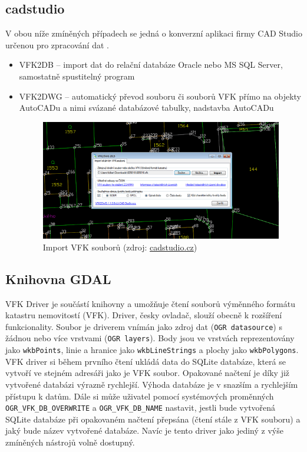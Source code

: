 \subsection{cadstudio}
V obou níže zmíněných případech se jedná o konverzní aplikaci firmy CAD Studio
určenou pro zpracování dat .
\begin{itemize}[leftmargin=50pt]
\item VFK2DB -- import dat do relační databáze Oracle nebo MS SQL Server, samostatně spustitelný program \cite{vfk2db} %
\item VFK2DWG -- automatický převod souboru či souborů VFK přímo na objekty AutoCADu a nimi svázané databázové tabulky, nadstavba AutoCADu \cite{vfk2dwg}

\begin{figure}[H]
	 \centering
      \includegraphics[width=14cm]{./pictures/vfk2dwg.png}
      \caption{Import VFK souborů (zdroj:
\href{http://www.cadstudio.cz/img/vfk2dwg11.gif}{cadstudio.cz})}
      \label{fig:cadstudio}
  \end{figure}
\end{itemize}
\subsection{Knihovna GDAL}
\label{subsec:gdal_vfk}
VFK Driver je součástí knihovny  a umožňuje čtení souborů
výměnného formátu katastru nemovitostí (VFK). Driver, česky ovladač,
slouží obecně k rozšíření funkcionality. Soubor  je driverem
vnímán jako zdroj dat (\verb|OGR datasource|) s žádnou nebo více
vrstvami (\verb|OGR layers|). Body jsou ve vrstvách reprezentovány
jako \verb|wkbPoints|, linie a hranice jako \verb|wkbLineStrings| a
plochy jako \verb|wkbPolygons|. VFK driver si během prvního čtení
ukládá data do SQLite databáze, která se vytvoří ve stejném adresáři
jako je VFK soubor. Opakované načtení je díky již vytvořené databázi
výrazně rychlejší. Výhoda databáze je v snazším a rychlejším přístupu
k datům. Dále si může uživatel pomocí systémových proměnných
\verb|OGR_VFK_DB_OVERWRITE| a \verb|OGR_VFK_DB_NAME| nastavit, jestli
bude vytvořená SQLite databáze při opakovaném načtení přepsána (čtení
stále z VFK souboru) a jaký bude název vytvořené databáze. Navíc je
tento driver jako jediný z výše zmíněných nástrojů volně
dostupný. \cite{vfk_driver}

